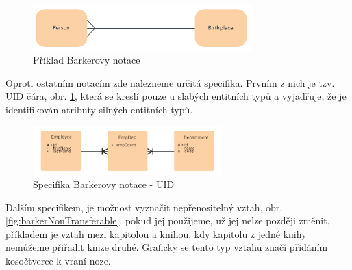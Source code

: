 \documentclass[czech,bachelor,public,dept460,male,oneside]{diploma}
\begin{document}
	\begin{figure}[!h]
		\centering
		\includegraphics[width=0.75\textwidth]{Figures/NotationExBarker}
		\caption[Příklad Barkerovy notace]{Příklad Barkerovy notace \cite{whatIsERD}}
	\end{figure}

	Oproti ostatním notacím zde nalezneme určitá specifika. Prvním z nich je tzv. UID čára, obr. \ref{fig:barkerUid}, která se kreslí pouze u slabých entitních typů a vyjadřuje, že je identifikován atributy silných entitních typů. 
	
	\begin{figure}[!h]
		\centering
		\includegraphics[width=0.65\textwidth]{Figures/BarkerUid}
		\caption[Specifika Barkerovy notace - UID]{Specifika Barkerovy notace - UID}
		\label{fig:barkerUid}
	\end{figure}
	
	Dalším specifikem, je možnost vyznačit nepřenositelný vztah, obr. \ref{fig:barkerNonTransferable}, pokud jej použijeme, už jej nelze později změnit, příkladem je vztah mezi kapitolou a knihou, kdy kapitolu z jedné knihy nemůžeme přiřadit knize druhé. Graficky se tento typ vztahu značí přidáním kosočtverce k vraní noze.
	
\end{document}
